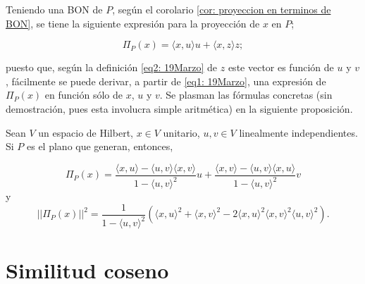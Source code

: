 Teniendo una BON de $P$, según el 
corolario 
\ref{cor: proyeccion en terminos de BON}, se tiene la siguiente
expresión para la proyección de $x$ en $P$;

\begin{equation}
\label{eq1: 19Marzo}
\Pi_{P}(x)= \langle x, u \rangle u + \langle x, z \rangle z;
\end{equation}

\noindent
puesto que, según la definición \eqref{eq2: 19Marzo} de 
$z$ este vector es función de $u$ y $v$, fácilmente se
puede derivar, a partir de \eqref{eq1: 19Marzo},
una expresión de $\Pi_{P}(x)$ en función sólo
de $x$, $u$ y $v$. Se plasman las fórmulas 
concretas (sin demostración, pues esta involucra
simple aritmética) en la siguiente proposición.

	\begin{prop}
	\label{prop: formulas 20Marzo}
	Sean $V$ un espacio de Hilbert, $x \in V$ unitario,
	$u,v \in V$ linealmente independientes. Si $P$ es el plano
	que generan, entonces,

		\begin{equation}
		\label{eq3: 19Marzo}
		\Pi_{P}(x)= \frac{\langle x, u \rangle -\langle u, v \rangle \langle x, v \rangle }{1-\langle u, v \rangle^{2}} u + \frac{\langle x, v \rangle -\langle u, v \rangle \langle x, u \rangle }{1-\langle u, v \rangle^{2}} v
		\end{equation}
	y 
		\begin{equation}
		\label{eq3: 19Marzo}
		  || \Pi_{P}(x) ||^{2}=
		  \frac{1}{1- \langle u, v \rangle^{2}} \left(  
	       \langle x, u \rangle^{2} +  \langle x, v \rangle^{2}	
	       -2  \langle x, u \rangle^{2} \langle x, v \rangle^{2} \langle u, v \rangle^{2}	  
		  \right).
		\end{equation}
 
	\end{prop}



\section{Similitud coseno}
\label{cosine similarity}

